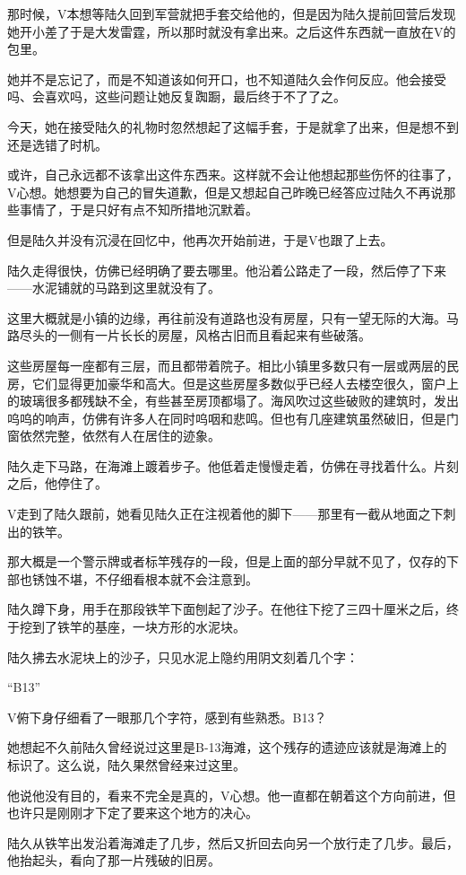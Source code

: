 那时候，V本想等陆久回到军营就把手套交给他的，但是因为陆久提前回营后发现她开小差了于是大发雷霆，所以那时就没有拿出来。之后这件东西就一直放在V的包里。

她并不是忘记了，而是不知道该如何开口，也不知道陆久会作何反应。他会接受吗、会喜欢吗，这些问题让她反复踟蹰，最后终于不了了之。

今天，她在接受陆久的礼物时忽然想起了这幅手套，于是就拿了出来，但是想不到还是选错了时机。

或许，自己永远都不该拿出这件东西来。这样就不会让他想起那些伤怀的往事了，V心想。她想要为自己的冒失道歉，但是又想起自己昨晚已经答应过陆久不再说那些事情了，于是只好有点不知所措地沉默着。

但是陆久并没有沉浸在回忆中，他再次开始前进，于是V也跟了上去。

陆久走得很快，仿佛已经明确了要去哪里。他沿着公路走了一段，然后停了下来——水泥铺就的马路到这里就没有了。

这里大概就是小镇的边缘，再往前没有道路也没有房屋，只有一望无际的大海。马路尽头的一侧有一片长长的房屋，风格古旧而且看起来有些破落。

这些房屋每一座都有三层，而且都带着院子。相比小镇里多数只有一层或两层的民房，它们显得更加豪华和高大。但是这些房屋多数似乎已经人去楼空很久，窗户上的玻璃很多都残缺不全，有些甚至房顶都塌了。海风吹过这些破败的建筑时，发出呜呜的响声，仿佛有许多人在同时呜咽和悲鸣。但也有几座建筑虽然破旧，但是门窗依然完整，依然有人在居住的迹象。

陆久走下马路，在海滩上踱着步子。他低着走慢慢走着，仿佛在寻找着什么。片刻之后，他停住了。

V走到了陆久跟前，她看见陆久正在注视着他的脚下——那里有一截从地面之下刺出的铁竿。

那大概是一个警示牌或者标竿残存的一段，但是上面的部分早就不见了，仅存的下部也锈蚀不堪，不仔细看根本就不会注意到。

陆久蹲下身，用手在那段铁竿下面刨起了沙子。在他往下挖了三四十厘米之后，终于挖到了铁竿的基座，一块方形的水泥块。

陆久拂去水泥块上的沙子，只见水泥上隐约用阴文刻着几个字：

“B13”

V俯下身仔细看了一眼那几个字符，感到有些熟悉。B13？

她想起不久前陆久曾经说过这里是B-13海滩，这个残存的遗迹应该就是海滩上的标识了。这么说，陆久果然曾经来过这里。

他说他没有目的，看来不完全是真的，V心想。他一直都在朝着这个方向前进，但也许只是刚刚才下定了要来这个地方的决心。

陆久从铁竿出发沿着海滩走了几步，然后又折回去向另一个放行走了几步。最后，他抬起头，看向了那一片残破的旧房。

